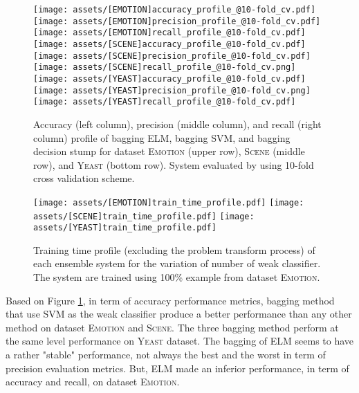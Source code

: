 \documentclass{article}
\begin{document}
\begin{figure*}[ht]
\vskip 0.2in
	\begin{subfigure}{}
	\centering
		\texttt{[image: assets/[EMOTION]accuracy\_profile\_@10-fold\_cv.pdf]}
		\texttt{[image: assets/[EMOTION]precision\_profile\_@10-fold\_cv.pdf]}
		\texttt{[image: assets/[EMOTION]recall\_profile\_@10-fold\_cv.pdf]}
		\texttt{[image: assets/[SCENE]accuracy\_profile\_@10-fold\_cv.pdf]}
		\texttt{[image: assets/[SCENE]precision\_profile\_@10-fold\_cv.pdf]}
		\texttt{[image: assets/[SCENE]recall\_profile\_@10-fold\_cv.png]}
		\texttt{[image: assets/[YEAST]accuracy\_profile\_@10-fold\_cv.pdf]}
		\texttt{[image: assets/[YEAST]precision\_profile\_@10-fold\_cv.png]}
		\texttt{[image: assets/[YEAST]recall\_profile\_@10-fold\_cv.pdf]}
		\caption{Accuracy (left column), precision (middle column), and recall (right column) profile of bagging ELM, bagging SVM, and bagging decision stump for dataset \textsc{Emotion} (upper row), \textsc{Scene} (middle row), and \textsc{Yeast} (bottom row). System evaluated by using 10-fold cross validation scheme.}
		\label{fig:experiment1}
	\end{subfigure}
\vskip -0.2in
\end{figure*} 

\begin{figure*}[htbp!]
\vskip 0.2in
	\begin{subfigure}{}
	\centering
		\texttt{[image: assets/[EMOTION]train\_time\_profile.pdf]}
		\texttt{[image: assets/[SCENE]train\_time\_profile.pdf]}
		\texttt{[image: assets/[YEAST]train\_time\_profile.pdf]}
		\caption{Training time profile (excluding the problem transform process) of each ensemble system for the variation of number of weak classifier. The system are trained using 100\% example from dataset \textsc{Emotion}.}
		\label{fig:experiment1b}
	\end{subfigure}
\end{figure*}

Based on Figure \ref{fig:experiment1}, in term of accuracy performance metrics, bagging method that use SVM as the weak classifier produce a better performance than any other method on dataset \textsc{Emotion} and \textsc{Scene}. The three bagging method perform at the same level performance on \textsc{Yeast} dataset. The bagging of ELM seems to have a rather "stable" performance, not always the best and the worst in term of precision evaluation metrics. But, ELM made an inferior performance, in term of accuracy and recall, on dataset \textsc{Emotion}.
\end{document}
